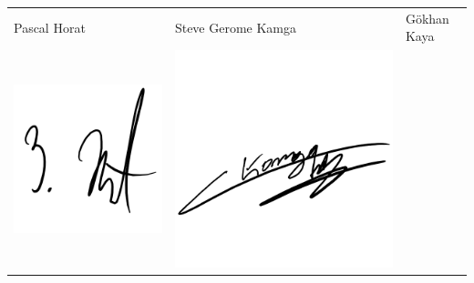 \begin{tabular}{p{6.5cm}p{6.5cm}p{6.5cm}}
Pascal Horat & Steve Gerome Kamga & Gökhan Kaya\\
\includegraphics[scale=0.6]{img/unterschriftPascal}&
\includegraphics[scale=0.6]{img/unterschriftGerome}&

\end{tabular}
